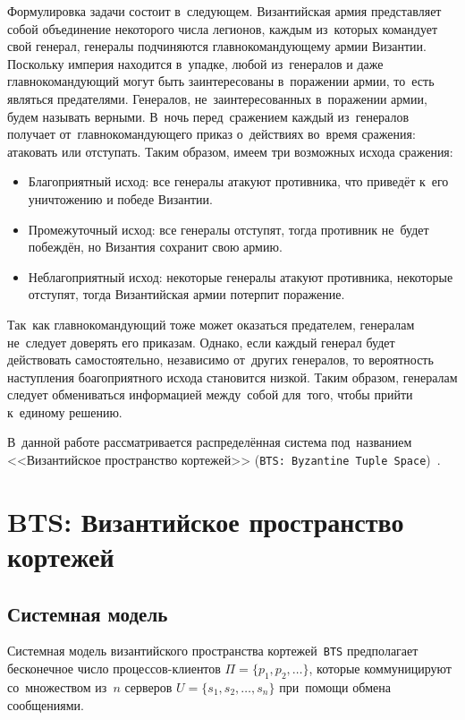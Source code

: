 Формулировка задачи состоит в~следующем. Византийская армия представляет собой объединение некоторого числа легионов, каждым из~которых командует свой генерал, генералы подчиняются главнокомандующему армии Византии. Поскольку империя находится в~упадке, любой из~генералов и даже главнокомандующий могут быть заинтересованы в~поражении армии, то~есть являться предателями. Генералов, не~заинтересованных в~поражении армии, будем называть верными. В~ночь перед~сражением каждый из~генералов получает от~главнокомандующего приказ о~действиях во~время сражения: атаковать или отступать. Таким образом, имеем три возможных исхода сражения:
\begin{itemize}
	\item Благоприятный исход: все генералы атакуют противника, что приведёт к~его уничтожению и победе Византии.
	\item Промежуточный исход: все генералы отступят, тогда противник не~будет побеждён, но Византия сохранит свою армию.
	\item Неблагоприятный исход: некоторые генералы атакуют противника, некоторые отступят, тогда Византийская армии потерпит поражение.
\end{itemize}

Так~как главнокомандующий тоже может оказаться предателем, генералам не~следует доверять его приказам. Однако, если каждый генерал будет действовать самостоятельно, независимо от~других генералов, то вероятность наступления боагоприятного исхода становится низкой. Таким образом, генералам следует обмениваться информацией между~собой для~того, чтобы прийти к~единому решению.

В~данной работе рассматривается распределённая система под~названием <<Византийское пространство кортежей>> (\texttt{BTS: Byzantine Tuple Space})~\autocite{bts}.


\section{BTS: Византийское пространство кортежей}\label{sec:2}
\subsection{Системная модель}\label{subsec:1}
Системная модель византийского пространства кортежей~\texttt{BTS} предполагает бесконечное число процессов-клиентов $\Pi = \{p_1, p_2, \dots\}$, которые коммуницируют со~множеством из~$n$ серверов $U = \{s_1, s_2, \dots, s_n\}$ при~помощи обмена сообщениями.


